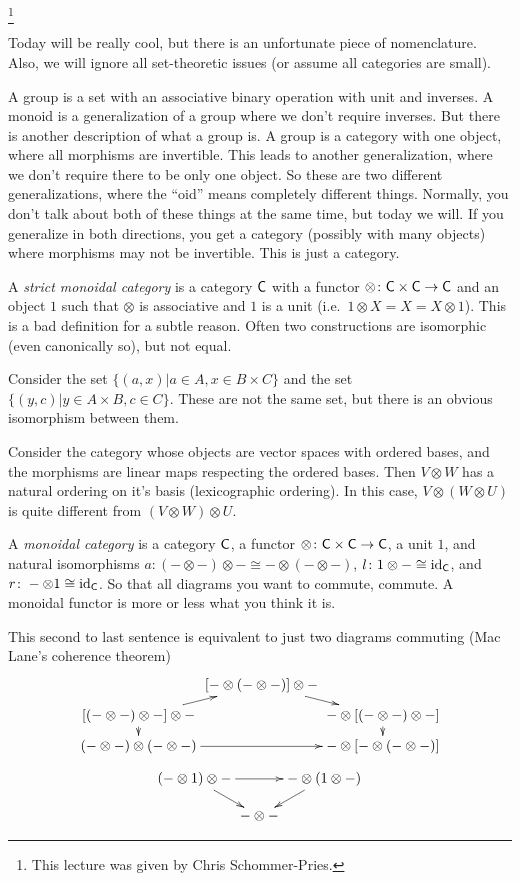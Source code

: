 \footnote{This lecture was given by Chris Schommer-Pries.}

Today will be really cool, but there is an unfortunate piece of nomenclature. Also, we will ignore all set-theoretic issues (or assume all categories are small).

A group is a set with an associative binary operation with unit and inverses. A monoid is a generalization of a group where we don't require inverses. But there is another description of what a group is. A group is a category with one object, where all morphisms are invertible. This leads to another generalization, where we don't require there to be only one object. So these are two different generalizations, where the ``oid'' means completely different things. Normally, you don't talk about both of these things at the same time, but today we will. If you generalize in both directions, you get a category (possibly with many objects) where morphisms may not be invertible. This is just a category.

A \emph{strict monoidal category} is a category $\text{\sf C}$ with a functor $\otimes\colon \text{\sf C}\times \text{\sf C}\to \text{\sf C}$ and an object $1$ such that $\otimes$ is associative and $1$ is a unit (i.e.~$1\otimes X=X=X\otimes 1$). This is a bad definition for a subtle reason. Often two constructions are isomorphic (even canonically so), but not equal.
\begin{example}
 Consider the set $\{(a,x)|a\in A,x\in B\times C\}$ and the set $\{(y,c)|y\in A\times B,c\in C\}$. These are not the same set, but there is an obvious isomorphism between them. 
\end{example}
\begin{example}
 Consider the category whose objects are vector spaces with ordered bases, and the morphisms are linear maps respecting the ordered bases. Then $V\otimes W$ has a natural ordering on it's basis (lexicographic ordering). In this case, $V\otimes(W\otimes U)$ is quite different from $(V\otimes W)\otimes U$.
\end{example}
\begin{definition}
 A \emph{monoidal category} is a category $\text{\sf C}$, a functor $\otimes\colon \text{\sf C}\times \text{\sf C}\to \text{\sf C}$, a unit $1$, and natural isomorphisms $a\colon (-\otimes-)\otimes-\cong -\otimes(-\otimes -)$, $l\colon 1\otimes-\cong \operatorname{id}_{\text{\sf C}}$, and $r\colon -\otimes 1\cong \operatorname{id}_{\text{\sf C}}$. So that all diagrams you want to commute, commute. A monoidal functor is more or less what you think it is.
\end{definition}
This second to last sentence is equivalent to just two diagrams commuting (Mac Lane's coherence theorem)
\[\xymatrix@R-1.5pc @C-2pc{
 & [-\otimes(-\otimes-)]\otimes-\ar[dr]\\
 [(-\otimes-)\otimes-] \otimes- \ar[ur]\ar[d] & & -\otimes[(-\otimes-)\otimes-]\ar[d]\\
 (-\otimes-)\otimes(-\otimes-) \ar[rr] & & -\otimes[-\otimes(-\otimes-)]
}\]
\[\xymatrix@C-2pc @R-1pc{
(-\otimes 1)\otimes- \ar[rr]\ar[dr] & & -\otimes(1\otimes-)\ar[dl]\\
 & -\otimes - 
}\]

